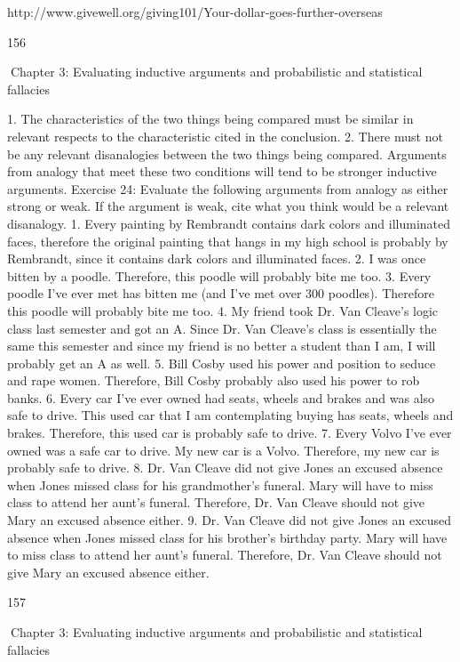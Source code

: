 http://www.givewell.org/giving101/Your-dollar-goes-further-overseas

156

Chapter 3: Evaluating inductive arguments and probabilistic and statistical fallacies

1. The characteristics of the two things being compared must be similar
in relevant respects to the characteristic cited in the conclusion.
2. There must not be any relevant disanalogies between the two things
being compared.
Arguments from analogy that meet these two conditions will tend to be stronger
inductive arguments.
Exercise 24: Evaluate the following arguments from analogy as either
strong or weak. If the argument is weak, cite what you think would be a
relevant disanalogy.
1. Every painting by Rembrandt contains dark colors and illuminated
faces, therefore the original painting that hangs in my high school is
probably by Rembrandt, since it contains dark colors and illuminated
faces.
2. I was once bitten by a poodle. Therefore, this poodle will probably
bite me too.
3. Every poodle I’ve ever met has bitten me (and I’ve met over 300
poodles). Therefore this poodle will probably bite me too.
4. My friend took Dr. Van Cleave’s logic class last semester and got an A.
Since Dr. Van Cleave’s class is essentially the same this semester and
since my friend is no better a student than I am, I will probably get an
A as well.
5. Bill Cosby used his power and position to seduce and rape women.
Therefore, Bill Cosby probably also used his power to rob banks.
6. Every car I’ve ever owned had seats, wheels and brakes and was also
safe to drive. This used car that I am contemplating buying has seats,
wheels and brakes. Therefore, this used car is probably safe to drive.
7. Every Volvo I’ve ever owned was a safe car to drive. My new car is a
Volvo. Therefore, my new car is probably safe to drive.
8. Dr. Van Cleave did not give Jones an excused absence when Jones
missed class for his grandmother’s funeral. Mary will have to miss
class to attend her aunt’s funeral. Therefore, Dr. Van Cleave should
not give Mary an excused absence either.
9. Dr. Van Cleave did not give Jones an excused absence when Jones
missed class for his brother’s birthday party. Mary will have to miss
class to attend her aunt’s funeral. Therefore, Dr. Van Cleave should
not give Mary an excused absence either.

157

Chapter 3: Evaluating inductive arguments and probabilistic and statistical fallacies

